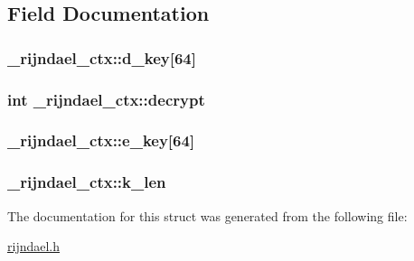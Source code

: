 \subsection{Field Documentation}
\hypertarget{struct__rijndael__ctx_a45e6be46127c0bb68886cd4c0c725dc6}{
\subsubsection[{d\-\_\-key}]{ \-\_\-rijndael\-\_\-ctx\-::d\-\_\-key\mbox{[}64\mbox{]}}}\label{struct__rijndael__ctx_a45e6be46127c0bb68886cd4c0c725dc6}
\hypertarget{struct__rijndael__ctx_aa07afd8353126ce5e938b42ceaff42b7}{
\subsubsection[{decrypt}]{\setlength{\rightskip}{0pt plus 5cm}int \-\_\-rijndael\-\_\-ctx\-::decrypt}}\label{struct__rijndael__ctx_aa07afd8353126ce5e938b42ceaff42b7}
\hypertarget{struct__rijndael__ctx_abc54a82997fe467b97400f22d9b4d7dc}{
\subsubsection[{e\-\_\-key}]{ \-\_\-rijndael\-\_\-ctx\-::e\-\_\-key\mbox{[}64\mbox{]}}}\label{struct__rijndael__ctx_abc54a82997fe467b97400f22d9b4d7dc}
\hypertarget{struct__rijndael__ctx_ac3595b891818be236ee4cbf50995b8af}{
\subsubsection[{k\-\_\-len}]{ \-\_\-rijndael\-\_\-ctx\-::k\-\_\-len}}\label{struct__rijndael__ctx_ac3595b891818be236ee4cbf50995b8af}


The documentation for this struct was generated from the following file\-:\begin{DoxyCompactItemize}
\item 
\hyperlink{rijndael_8h}{rijndael.\-h}\end{DoxyCompactItemize}
